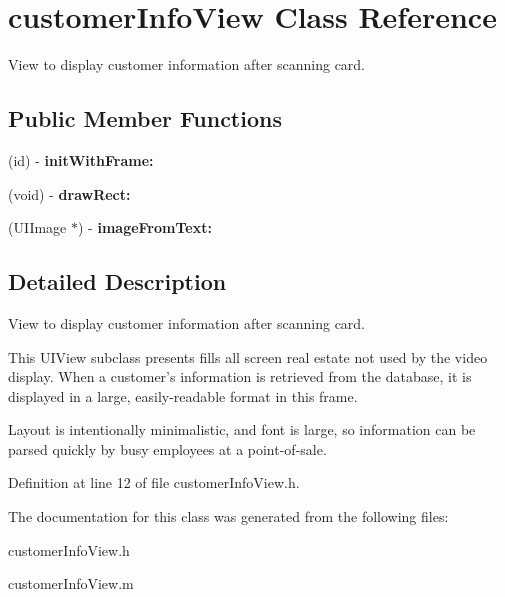 \hypertarget{interfacecustomer_info_view}{
\section{customerInfoView Class Reference}
\label{interfacecustomer_info_view}
}


View to display customer information after scanning card.  


\subsection*{Public Member Functions}
\begin{DoxyCompactItemize}
\item 
\hypertarget{interfacecustomer_info_view_a970f3fd749a135874bd888820bb42efd}{
(id) -\/ {\bfseries initWithFrame:}}
\label{interfacecustomer_info_view_a970f3fd749a135874bd888820bb42efd}

\item 
\hypertarget{interfacecustomer_info_view_a04a6955a549e380f96ac45dcadcfb8fc}{
(void) -\/ {\bfseries drawRect:}}
\label{interfacecustomer_info_view_a04a6955a549e380f96ac45dcadcfb8fc}

\item 
\hypertarget{interfacecustomer_info_view_abc72b2cce95ea91f9298516eab94892b}{
(UIImage $\ast$) -\/ {\bfseries imageFromText:}}
\label{interfacecustomer_info_view_abc72b2cce95ea91f9298516eab94892b}

\end{DoxyCompactItemize}


\subsection{Detailed Description}
View to display customer information after scanning card. 

This UIView subclass presents fills all screen real estate not used by the video display. When a customer's information is retrieved from the database, it is displayed in a large, easily-\/readable format in this frame.

Layout is intentionally minimalistic, and font is large, so information can be parsed quickly by busy employees at a point-\/of-\/sale. 

Definition at line 12 of file customerInfoView.h.



The documentation for this class was generated from the following files:\begin{DoxyCompactItemize}
\item 
customerInfoView.h\item 
customerInfoView.m\end{DoxyCompactItemize}
